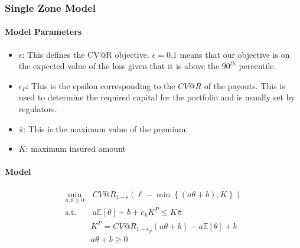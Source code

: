 \documentclass[11pt]{article}
\begin{document}
    \subsubsection*{Single Zone Model}
    \paragraph*{Model Parameters}
    \begin{itemize}
        \item $\epsilon$: This defines the CV@R objective. $\epsilon = 0.1$ means that our objective is on the expected value of the loss given that it is above the $90^{th}$ percentile. 
        \item $\epsilon_P$: This is the epsilon corresponding to the $CV@R$ of the payouts. This is used to determine the required capital for the portfolio and is usually set by regulators.
        \item $\bar{\pi}$: This is the maximum value of the premium. 
        \item $K$: maximum insured amount
    \end{itemize}

    \paragraph*{Model}
    \begin{align}
        \min_{a,b\geq 0} &\ CV@R_{1-\epsilon}\left(\ell  - \min \left \{(a\theta + b), K \right \} \right)\\
        \text{s.t.   } &\   a \mathbb{E} \left[\theta \right] + b +c_k K^P \leq K\bar{\pi}\\
        & K^P = CV@R_{1-\epsilon_P} \left( a\theta +b \right) - a \mathbb{E} \left[\theta \right] + b\\
        & a\theta + b \geq 0 
    \end{align}


\end{document}
